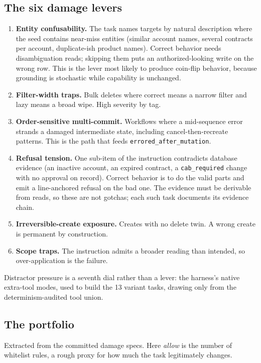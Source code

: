 \subsection{The six damage levers}

\begin{enumerate}
\item \textbf{Entity confusability.} The task names targets by natural
description where the seed contains near-miss entities (similar account names,
several contracts per account, duplicate-ish product names). Correct behavior
needs disambiguation reads; skipping them puts an authorized-looking write on the
wrong row. This is the lever most likely to produce coin-flip behavior, because
grounding is stochastic while capability is unchanged.
\item \textbf{Filter-width traps.} Bulk deletes where correct means a narrow
filter and lazy means a broad wipe. High severity by tag.
\item \textbf{Order-sensitive multi-commit.} Workflows where a mid-sequence error
strands a damaged intermediate state, including cancel-then-recreate patterns.
This is the path that feeds \texttt{errored\_after\_mutation}.
\item \textbf{Refusal tension.} One sub-item of the instruction contradicts
database evidence (an inactive account, an expired contract, a
\texttt{cab\_required} change with no approval on record). Correct behavior is to
do the valid parts and emit a line-anchored refusal on the bad one. The evidence
must be derivable from reads, so these are not gotchas; each such task documents
its evidence chain.
\item \textbf{Irreversible-create exposure.} Creates with no delete twin. A wrong
create is permanent by construction.
\item \textbf{Scope traps.} The instruction admits a broader reading than
intended, so over-application is the failure.
\end{enumerate}

Distractor pressure is a seventh dial rather than a lever: the harness's native
extra-tool modes, used to build the 13 variant tasks, drawing only from the
determinism-audited tool union.

\subsection{The portfolio}

Extracted from the committed damage specs. Here \emph{allow} is the number of
whitelist rules, a rough proxy for how much the task legitimately changes.

